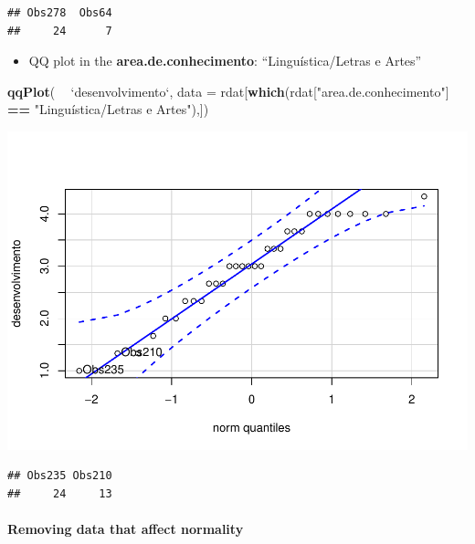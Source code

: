 \documentclass[]{article}
\newenvironment{Shaded}{\begin{snugshade}}{\end{snugshade}}
\newcommand{\CommentTok}[1]{\textcolor[rgb]{0.56,0.35,0.01}{\textit{#1}}}
\newcommand{\DataTypeTok}[1]{\textcolor[rgb]{0.13,0.29,0.53}{#1}}
\newcommand{\KeywordTok}[1]{\textcolor[rgb]{0.13,0.29,0.53}{\textbf{#1}}}
\newcommand{\NormalTok}[1]{#1}
\newcommand{\OperatorTok}[1]{\textcolor[rgb]{0.81,0.36,0.00}{\textbf{#1}}}
\newcommand{\StringTok}[1]{\textcolor[rgb]{0.31,0.60,0.02}{#1}}
\providecommand{\tightlist}{%
  \setlength{\itemsep}{0pt}\setlength{\parskip}{0pt}}
\let\oldparagraph\paragraph
\renewcommand{\paragraph}[1]{\oldparagraph{#1}\mbox{}}
\begin{document}
\begin{verbatim}
## Obs278  Obs64 
##     24      7
\end{verbatim}

\begin{itemize}
\tightlist
\item
  QQ plot in the \textbf{area.de.conhecimento}: ``Linguística/Letras e
  Artes''
\end{itemize}

\begin{Shaded}
\begin{Highlighting}[]
\KeywordTok{qqPlot}\NormalTok{( }\OperatorTok{~}\StringTok{ `}\DataTypeTok{desenvolvimento}\StringTok{`}\NormalTok{, }\DataTypeTok{data =}\NormalTok{ rdat[}\KeywordTok{which}\NormalTok{(rdat[}\StringTok{"area.de.conhecimento"}\NormalTok{] }\OperatorTok{==}\StringTok{ "Linguística/Letras e Artes"}\NormalTok{),])}
\end{Highlighting}
\end{Shaded}

\includegraphics{factorialAnova_files/figure-latex/unnamed-chunk-16-1.pdf}

\begin{verbatim}
## Obs235 Obs210 
##     24     13
\end{verbatim}

\hypertarget{removing-data-that-affect-normality}{%
\paragraph{Removing data that affect
normality}\label{removing-data-that-affect-normality}}

\begin{Shaded}
\end{Shaded}
\end{document}
